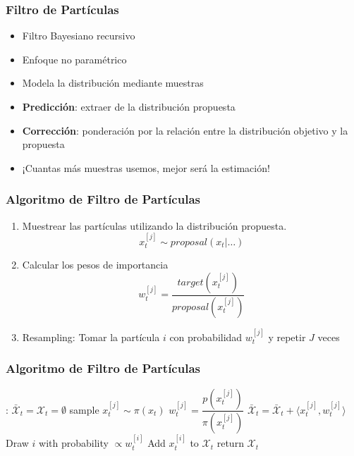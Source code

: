 \begin{frame}
    \frametitle{Filtro de Partículas}
    \begin{itemize}
        \item Filtro Bayesiano recursivo
        \item Enfoque no paramétrico
        \item Modela la distribución mediante muestras
        \item \textbf{Predicción}: extraer de la distribución propuesta
        \item \textbf{Corrección}: ponderación por la relación entre la distribución objetivo y la propuesta
        \item \alert{¡Cuantas más muestras usemos, mejor será la estimación!}
    \end{itemize}
\end{frame}
    
\begin{frame}
    \frametitle{Algoritmo de Filtro de Partículas}
    \begin{enumerate}
        \item Muestrear las partículas utilizando la distribución propuesta.
        \begin{equation*}
            x_t^{[j]} \sim proposal(x_t | \ldots)
        \end{equation*}
        \item Calcular los pesos de importancia
        \begin{equation*}
            w_t^{[j]} = \frac{target(x_t^{[j]})}{proposal(x_t^{[j]})}
        \end{equation*}
        \item Resampling: Tomar la partícula $i$ con probabilidad $w_t^{[j]}$ y repetir $J$ veces 
    \end{enumerate}
\end{frame}

\begin{frame}
    \frametitle{Algoritmo de Filtro de Partículas}
    \begin{algorithmic}[1]
    :
    \State $\bar{\mathcal{X}}_t = \mathcal{X}_t = \emptyset$
        \State sample $x_t^{[j]} \sim \pi(x_t)$
        \State $w_t^{[j]} = \dfrac{p(x_t^{[j]})}{\pi(x_{t}^{[j]})}$
        \State $\bar{\mathcal{X}}_t = \bar{\mathcal{X}}_t + \langle x_t^{[j]}, w_t^{[j]}\rangle$
    \EndFor
        \State Draw $i$ with probability $\propto w_t^{[i]}$
        \State Add $x_t^{[i]}$ to $\mathcal{X}_t$
    \EndFor
    \State return $\mathcal{X}_t$
    \EndProcedure
    \end{algorithmic}
\end{frame}


